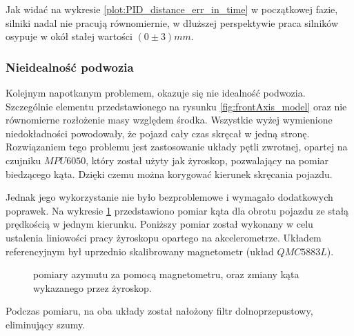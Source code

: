             Jak widać na wykresie \ref{plot:PID_distance_err_in_time} w początkowej fazie, silniki nadal nie pracują równomiernie, w dłuższej perspektywie praca silników osypuje w okół stałej wartości $(0 \pm 3)mm$.

    \subsubsection{Nieidealność podwozia}
        Kolejnym napotkanym problemem, okazuje się nie idealność podwozia.
        Szczególnie elementu przedstawionego na rysunku \ref{fig:frontAxis_model} oraz nie równomierne rozłożenie masy względem środka.
        Wszystkie wyżej wymienione niedokładności powodowały, że pojazd cały czas skręcał w jedną stronę.
        Rozwiązaniem tego problemu jest zastosowanie układy pętli zwrotnej, opartej na czujniku $MPU6050$, który został użyty jak żyroskop, pozwalający na pomiar biedzącego kąta.
        Dzięki czemu można korygować kierunek skręcania pojazdu.
        
        Jednak jego wykorzystanie nie było bezproblemowe i wymagało dodatkowych poprawek.
        Na wykresie \ref{plot:gyro_magneto_measure} przedstawiono pomiar kąta dla obrotu pojazdu ze stałą prędkością w jednym kierunku.
        Poniższy pomiar został wykonany w celu ustalenia liniowości pracy żyroskopu opartego na akcelerometrze. 
        Układem referencyjnym był uprzednio skalibrowany magnetometr (układ $QMC5883L$).
% 
        \begin{figure}[!ht]
            \centering
                \renewcommand{\figurename}{Wykres}
                \caption{pomiary azymutu za pomocą magnetometru, oraz zmiany kąta wykazanego przez żyroskop.}
                \label{plot:gyro_magneto_measure}
        \end{figure}
        Podczas pomiaru, na oba układy został nałożony filtr dolnoprzepustowy, eliminujący szumy.

